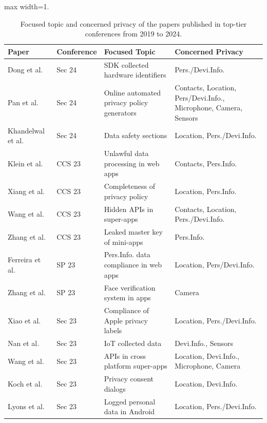 \begin{table}[]
\caption{Focused topic and concerned privacy of the papers published in top-tier conferences from 2019 to 2024.}
\label{tab:paper_summary}
\begin{adjustbox}{max width=1.\linewidth}
\begin{tabular}{llll}
\hline
\textbf{Paper} & \textbf{Conference} & \textbf{Focused Topic} & \textbf{Concerned Privacy} \\ \hline
Dong et al.~\cite{dongexploring} & Sec 24 & SDK collected hardware identifiers & Pers./Devi.Info. \\
Pan et al.~\cite{pantrap} & Sec 24 & Online automated privacy policy generators & Contacts, Location, Pers/Devi.Info., Microphone, Camera, Sensors \\
Khandelwal et al.~\cite{khandelwal2023unpacking} & Sec 24 & Data safety sections & Location, Pers./Devi.Info. \\
Klein et al.~\cite{klein2023general} & CCS 23 & Unlawful data processing in web apps & Contacts, Pers.Info. \\
Xiang et al.~\cite{10.1145/3576915.3623067} & CCS 23 & Completeness of privacy policy & Location, Pers.Info. \\
Wang et al.~\cite{10.1145/3576915.3616676} & CCS 23 & Hidden APIs in super-apps & Contacts, Location, Pers./Devi.Info. \\
Zhang et al.~\cite{10.1145/3576915.3616591} & CCS 23 & Leaked master key of mini-apps & Pers.Info. \\
Ferreira et al.~\cite{ferreira2023rulekeeper} & SP 23 & Pers.Info. data compliance in web apps & Location, Pers/Devi.Info. \\
Zhang et al.~\cite{zhang2023understanding} & SP 23 & Face verification system in apps & Camera \\
Xiao et al.~\cite{xiao2023lalaine} & Sec 23 & Compliance of Apple privacy labels & Location, Pers./Devi.Info. \\
Nan et al.~\cite{nan2023are} & Sec 23 & IoT collected data & Devi.Info., Sensors \\
Wang et al.~\cite{10.5555/3620237.3620608} & Sec 23 & APIs in cross platform super-apps & Location, Devi.Info., Microphone, Camera \\
Koch et al.~\cite{koch2023ok} & Sec 23 & Privacy consent dialogs & Location, Devi.Info. \\
Lyons et al.~\cite{lyons2023log} & Sec 23 & Logged personal data in Android & Location, Pers./Devi.Info. \\

\end{tabular}
\end{adjustbox}
\end{table}
